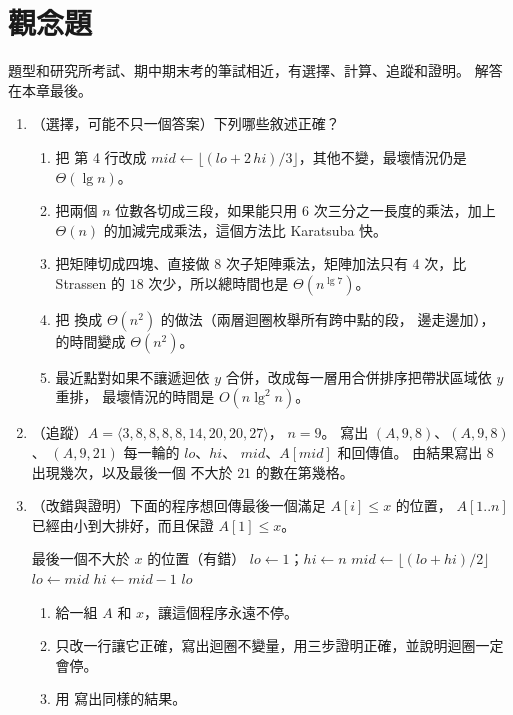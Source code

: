 \section{觀念題}
\label{sec:dc-exercises}

題型和研究所考試、期中期末考的筆試相近，有選擇、計算、追蹤和證明。 解答在本章最後。

\begin{enumerate}
\item \label{dc-q-tf}（選擇，可能不只一個答案）下列哪些敘述正確？
\begin{enumerate}
\item 把  第 4 行改成 $\mathit{mid} \gets \lfloor (\mathit{lo} +
2\,\mathit{hi})/3 \rfloor$，其他不變，最壞情況仍是 $\Theta(\lg n)$。
\item 把兩個 $n$ 位數各切成三段，如果能只用 $6$ 次三分之一長度的乘法，加上
$\Theta(n)$ 的加減完成乘法，這個方法比 Karatsuba 快。
\item 把矩陣切成四塊、直接做 $8$ 次子矩陣乘法，矩陣加法只有 $4$ 次，比 Strassen 的
$18$ 次少，所以總時間也是 $\Theta(n^{\lg 7})$。
\item 把  換成 $\Theta(n^2)$ 的做法（兩層迴圈枚舉所有跨中點的段，
邊走邊加）， 的時間變成 $\Theta(n^2)$。
\item 最近點對如果不讓遞迴依 $y$ 合併，改成每一層用合併排序把帶狀區域依 $y$ 重排，
最壞情況的時間是 $O(n \lg^2 n)$。
\end{enumerate}

\item \label{dc-q-bounds}（追蹤）$A = \langle 3, 8, 8, 8, 8, 14, 20, 20, 27 \rangle$，
$n = 9$。 寫出 $(A, 9, 8)$、$(A, 9, 8)$、
$(A, 9, 21)$ 每一輪的 $\mathit{lo}$、$\mathit{hi}$、
$\mathit{mid}$、$A[\mathit{mid}]$ 和回傳值。 由結果寫出 $8$ 出現幾次，以及最後一個
不大於 $21$ 的數在第幾格。

\item \label{dc-q-fix}（改錯與證明）下面的程序想回傳最後一個滿足 $A[i] \le x$ 的位置，
$A[1..n]$ 已經由小到大排好，而且保證 $A[1] \le x$。
\begin{pseudo}{最後一個不大於 $x$ 的位置（有錯）}
    \State $\mathit{lo} \gets 1$；$\mathit{hi} \gets n$
        \State $\mathit{mid} \gets \lfloor (\mathit{lo} + \mathit{hi}) / 2 \rfloor$
            \State $\mathit{lo} \gets \mathit{mid}$
        \Else
            \State $\mathit{hi} \gets \mathit{mid} - 1$
        \EndIf
    \EndWhile
    \State \Return $\mathit{lo}$
\EndFunction
\end{pseudo}
\begin{enumerate}
\item 給一組 $A$ 和 $x$，讓這個程序永遠不停。
\item 只改一行讓它正確，寫出迴圈不變量，用三步證明正確，並說明迴圈一定會停。
\item 用  寫出同樣的結果。
\end{enumerate}


\end{enumerate}
